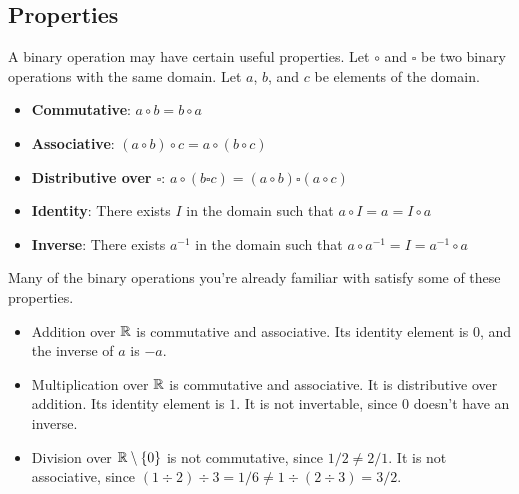\subsection{Properties}

A binary operation may have certain useful properties.
Let $\circ$ and $\square$ be two binary operations with the same domain.
Let $a$, $b$, and $c$ be elements of the domain.
\begin{itemize}
	\item \textbf{Commutative}: $a \circ b = b \circ a$
	\item \textbf{Associative}: $(a \circ b) \circ c = a \circ (b \circ c)$
	\item \textbf{Distributive over $\square$}: $a \circ (b \square c) = (a \circ b) \square (a \circ c)$
	\item \textbf{Identity}: There exists $I$ in the domain such that $a \circ I = a = I \circ a$
	\item \textbf{Inverse}: There exists $a^{-1}$ in the domain such that $a \circ a^{-1} = I = a^{-1} \circ a$
\end{itemize}

Many of the binary operations you're already familiar with satisfy some of these properties.
\begin{example}
	\hspace{1pt}
	\begin{itemize}
		\item
			Addition over $\mathbb{R}$ is commutative and associative.
			Its identity element is $0$, and the inverse of $a$ is $-a$.
		\item
			Multiplication over $\mathbb{R}$ is commutative and associative.
			It is distributive over addition.
			Its identity element is $1$.
			It is not invertable, since 0 doesn't have an inverse.
		\item
			Division over $\mathbb{R} \setminus \{0\}$ is not commutative, since $1/2 \neq 2/1$.
			It is not associative, since $(1 \div 2) \div 3 = 1/6 \neq 1 \div (2 \div 3) = 3/2$.
	\end{itemize}
\end{example}
